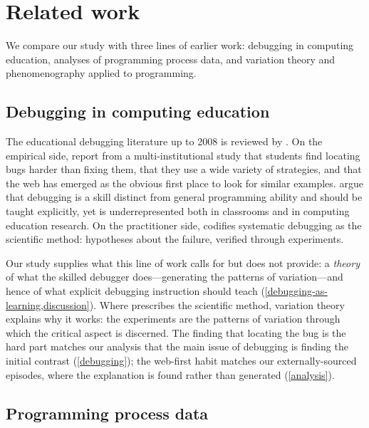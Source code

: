 \mode*
\section{Related work}
\label{related-work}

We compare our study with three lines of earlier work: debugging in
computing education, analyses of programming process data, and variation
theory and phenomenography applied to programming.

\subsection{Debugging in computing education}

The educational debugging literature up to 2008 is reviewed by
\textcite{DebuggingReview}.
On the empirical side, \textcite{DebuggingStudentPerspective} report from a
multi-institutional study that students find locating bugs harder than
fixing them, that they use a wide variety of strategies, and that the web
has emerged as the obvious first place to look for similar examples.
\Textcite{MichaeliRomeike2019} argue that debugging is a skill distinct
from general programming ability and should be taught explicitly, yet is
underrepresented both in classrooms and in computing education research.
On the practitioner side, \textcite{WhyProgramsFail} codifies systematic
debugging as the scientific method: hypotheses about the failure,
verified through experiments.

Our study supplies what this line of work calls for but does not provide:
a \emph{theory} of what the skilled debugger does---generating the patterns
of variation---and hence of what explicit debugging instruction should
teach (\cref{debugging-as-learning,discussion}).
Where \citeauthor{WhyProgramsFail} prescribes the scientific method,
variation theory explains why it works: the experiments are the patterns
of variation through which the critical aspect is discerned.
The finding that locating the bug is the hard part matches our analysis
that the main issue of debugging is finding the initial contrast
(\cref{debugging}); the web-first habit matches our externally-sourced
episodes, where the explanation is found rather than generated
(\cref{analysis}).

\subsection{Programming process data}

